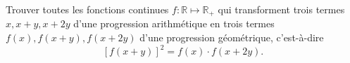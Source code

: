Trouver toutes les fonctions continues $f : \mathbb{R} \mapsto \mathbb{R}_+$ qui transforment trois termes $x, x + y, x + 2y$ d'une progression arithmétique en trois termes $f(x), f(x + y), f(x + 2y)$ d'une progression géométrique, c'est-à-dire
\[ [f(x + y)]^2 = f(x) \cdot f(x + 2y). \]
